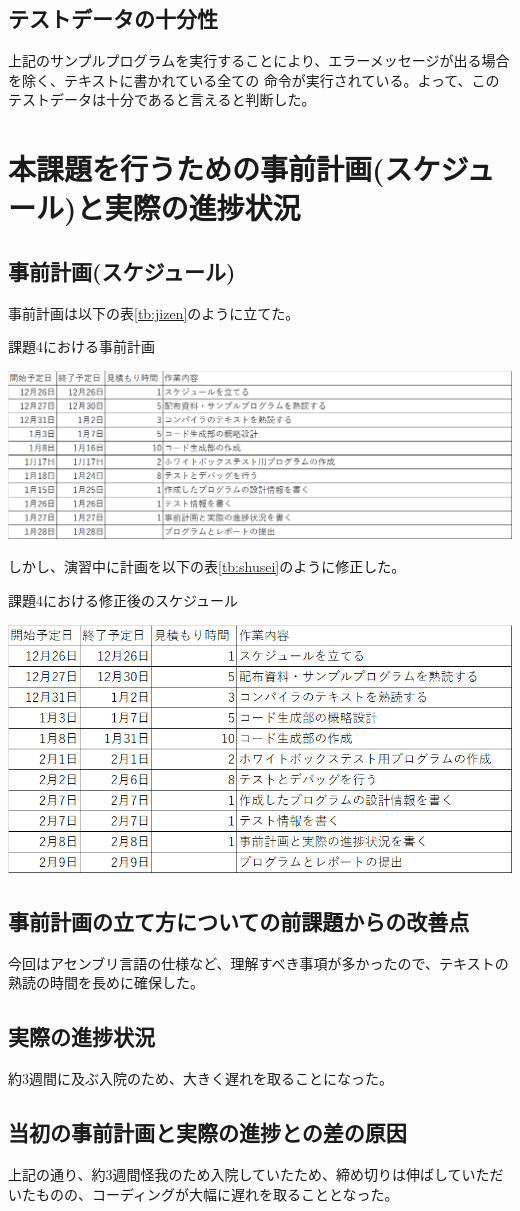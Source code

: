 \documentclass{jarticle}
\begin{document}
\subsection{テストデータの十分性}
上記のサンプルプログラムを実行することにより、エラーメッセージが出る場合を除く、テキストに書かれている全ての
命令が実行されている。よって、このテストデータは十分であると言えると判断した。
\section{本課題を行うための事前計画(スケジュール)と実際の進捗状況}
\subsection{事前計画(スケジュール)}
事前計画は以下の表\ref{tb:jizen}のように立てた。
\begin{table}[H]
\begin{center}
\caption{課題4における事前計画}
\label{tb:jizen}
\includegraphics[scale=0.6]{kadai4_jizen.png}
\end{center}
\end{table}

しかし、演習中に計画を以下の表\ref{tb:shusei}のように修正した。
\begin{table}[H]
\begin{center}
\caption{課題4における修正後のスケジュール}
\label{tb:shusei}
\includegraphics[scale=0.6]{kadai4_shusei.png}
\end{center}
\end{table}
\subsection{事前計画の立て方についての前課題からの改善点}
今回はアセンブリ言語の仕様など、理解すべき事項が多かったので、テキストの熟読の時間を長めに確保した。
\subsection{実際の進捗状況}
約3週間に及ぶ入院のため、大きく遅れを取ることになった。
\subsection{当初の事前計画と実際の進捗との差の原因}
上記の通り、約3週間怪我のため入院していたため、締め切りは伸ばしていただいたものの、コーディングが大幅に遅れを取ることとなった。
\end{document}
